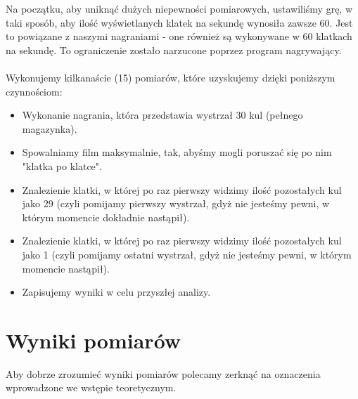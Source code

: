 \documentclass[a4paper,12pt]{article}
\begin{document}
\begin{justify}
Na początku, aby uniknąć dużych niepewności pomiarowych, ustawiliśmy grę, w taki sposób, aby ilość wyświetlanych klatek na sekundę wynosiła zawsze 60. Jest to powiązane z naszymi nagraniami - one również są wykonywane w 60 klatkach na sekundę. To ograniczenie zostało narzucone poprzez program nagrywający. \\ \, \\
Wykonujemy kilkanaście (15) pomiarów, które uzyskujemy dzięki poniższym czynnościom:
\begin{itemize}
\item Wykonanie nagrania, która przedstawia wystrzał 30 kul (pełnego magazynka).
\item Spowalniamy film maksymalnie, tak, abyśmy mogli poruszać się po nim "klatka po klatce".
\item Znalezienie klatki, w której po raz pierwszy widzimy ilość pozostałych kul jako 29 (czyli pomijamy pierwszy wystrzał, gdyż nie jesteśmy pewni, w którym momencie dokładnie nastąpił).
\item Znalezienie klatki, w której po raz pierwszy widzimy ilość pozostałych kul jako 1 (czyli pomijamy ostatni wystrzał, gdyż nie jesteśmy pewni, w którym momencie nastąpił).
\item Zapisujemy wyniki w celu przyszłej analizy.
\end{itemize}

\section{Wyniki pomiarów}

Aby dobrze zrozumieć wyniki pomiarów  polecamy zerknąć na oznaczenia wprowadzone we wstępie teoretycznym.


\end{justify}
\end{document}
